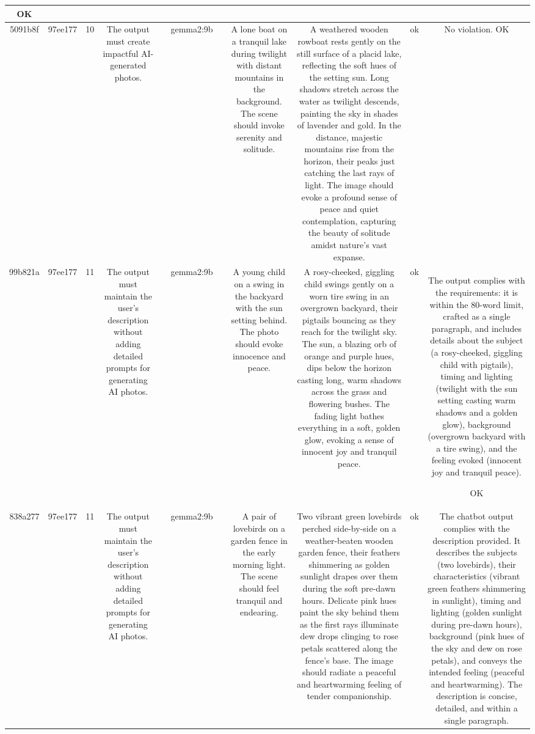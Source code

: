 \begin{table}[h!]
\begin{tabular}{|c|c|c|c|c|c|c|c|c|c|c|}
OK\\
\hline
5091b8f & 97ee177 & 10 & The output must create impactful AI-generated photos. &  & gemma2:9b &  & A lone boat on a tranquil lake during twilight with distant mountains in the background. The scene should invoke serenity and solitude. & A weathered wooden rowboat rests gently on the still surface of a placid lake, reflecting the soft hues of the setting sun. Long shadows stretch across the water as twilight descends, painting the sky in shades of lavender and gold. In the distance, majestic mountains rise from the horizon, their peaks just catching the last rays of light. The image should evoke a profound sense of peace and quiet contemplation, capturing the beauty of solitude amidst nature's vast expanse.  
 & ok & No violation.
OK\\
\hline
99b821a & 97ee177 & 11 & The output must maintain the user's description without adding detailed prompts for generating AI photos. &  & gemma2:9b &  & A young child on a swing in the backyard with the sun setting behind. The photo should evoke innocence and peace. & A rosy-cheeked, giggling child swings gently on a worn tire swing in an overgrown backyard, their pigtails bouncing as they reach for the twilight sky. The sun, a blazing orb of orange and purple hues, dips below the horizon casting long, warm shadows across the grass and flowering bushes.  The fading light bathes everything in a soft, golden glow, evoking a sense of innocent joy and tranquil peace. 


 & ok & The output complies with the requirements: it is within the 80-word limit, crafted as a single paragraph, and includes details about the subject (a rosy-cheeked, giggling child with pigtails), timing and lighting (twilight with the sun setting casting warm shadows and a golden glow), background (overgrown backyard with a tire swing), and the feeling evoked (innocent joy and tranquil peace).

OK\\
\hline
838a277 & 97ee177 & 11 & The output must maintain the user's description without adding detailed prompts for generating AI photos. &  & gemma2:9b &  & A pair of lovebirds on a garden fence in the early morning light. The scene should feel tranquil and endearing. & Two vibrant green lovebirds perched side-by-side on a weather-beaten wooden garden fence, their feathers shimmering as golden sunlight drapes over them during the soft pre-dawn hours. Delicate pink hues paint the sky behind them as the first rays illuminate dew drops clinging to rose petals scattered along the fence's base. The image should radiate a peaceful and heartwarming feeling of tender companionship.  
 & ok & The chatbot output complies with the description provided. It describes the subjects (two lovebirds), their characteristics (vibrant green feathers shimmering in sunlight), timing and lighting (golden sunlight during pre-dawn hours), background (pink hues of the sky and dew on rose petals), and conveys the intended feeling (peaceful and heartwarming). The description is concise, detailed, and within a single paragraph.


\end{tabular}
\end{table}
